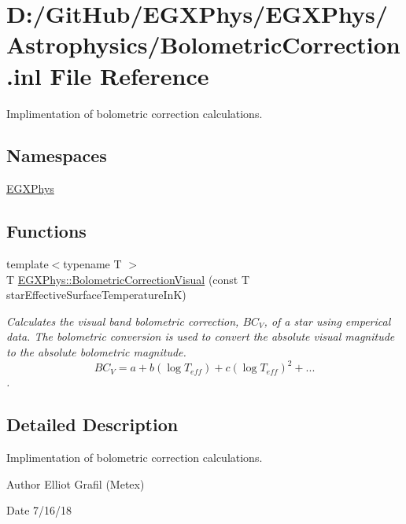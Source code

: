 \hypertarget{_bolometric_correction_8inl}{}\section{D\+:/\+Git\+Hub/\+E\+G\+X\+Phys/\+E\+G\+X\+Phys/\+Astrophysics/\+Bolometric\+Correction.inl File Reference}
\label{_bolometric_correction_8inl}


Implimentation of bolometric correction calculations.  


\subsection*{Namespaces}
\begin{DoxyCompactItemize}
\item 
 \mbox{\hyperlink{namespace_e_g_x_phys}{E\+G\+X\+Phys}}
\end{DoxyCompactItemize}
\subsection*{Functions}
\begin{DoxyCompactItemize}
\item 
{\footnotesize template$<$typename T $>$ }\\T \mbox{\hyperlink{group___e_g_x_phys-_astrophysic-_bolometric_correction_ga31e794be67c861c4eb84d58e8e88883c}{E\+G\+X\+Phys\+::\+Bolometric\+Correction\+Visual}} (const T star\+Effective\+Surface\+Temperature\+InK)
\begin{DoxyCompactList}\small\item\em Calculates the visual band bolometric correction, $BC_{V}$, of a star using emperical data. The bolometric conversion is used to convert the absolute visual magnitude to the absolute bolometric magnitude. \[ BC_{V}=a + b ( \log T_{eff}) + c ( \log T_{eff})^2 + ...\]. \end{DoxyCompactList}\end{DoxyCompactItemize}


\subsection{Detailed Description}
Implimentation of bolometric correction calculations. 

\begin{DoxyAuthor}{Author}
Elliot Grafil (Metex) 
\end{DoxyAuthor}
\begin{DoxyDate}{Date}
7/16/18 
\end{DoxyDate}
